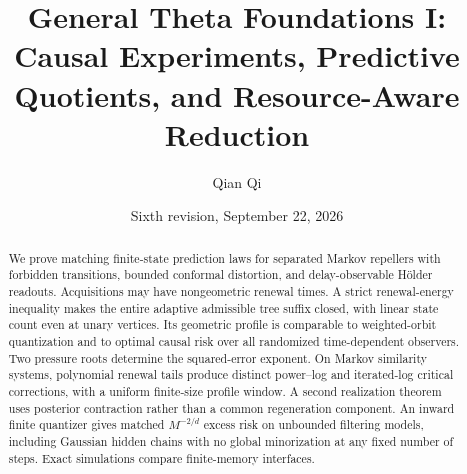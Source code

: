 
\title[General Theta Foundations I]{General Theta Foundations I: Causal Experiments, Predictive Quotients, and Resource-Aware Reduction}
\author{Qian Qi}
\date{Sixth revision, September 22, 2026}

\begin{abstract}
We prove matching finite-state prediction laws for separated Markov
repellers with forbidden transitions, bounded conformal distortion,
and delay-observable H\"older readouts. Acquisitions may have
nongeometric renewal times. A strict renewal-energy inequality makes
the entire adaptive admissible tree suffix closed, with linear state
count even at unary vertices. Its geometric profile is comparable to
weighted-orbit quantization and to optimal causal risk over all
randomized time-dependent observers. Two pressure roots determine the
squared-error exponent. On Markov similarity systems, polynomial
renewal tails produce distinct power--log and iterated-log critical
corrections, with a uniform finite-size profile window. A second
realization theorem uses posterior contraction rather than a common
regeneration component. An inward finite quantizer gives matched
$M^{-2/d}$ excess risk on unbounded filtering models, including
Gaussian hidden chains with no global minorization at any fixed
number of steps. Exact simulations compare finite-memory interfaces.
\end{abstract}
\maketitle
\tableofcontents
